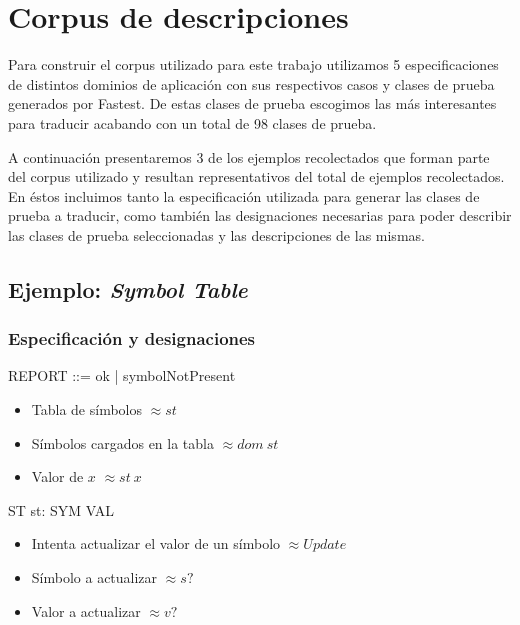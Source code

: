 \chapter{Corpus de descripciones}
\label{ape:corpus}

Para construir el corpus utilizado para este trabajo utilizamos 5 especificaciones de distintos dominios de aplicación con sus respectivos casos y clases de prueba generados por Fastest. De estas clases de prueba escogimos las más interesantes para traducir acabando con un total de 98 clases de prueba.

A continuación presentaremos 3 de los ejemplos recolectados que forman parte del corpus utilizado y resultan representativos del total de ejemplos recolectados. En éstos incluimos tanto la especificación utilizada para generar las clases de prueba a traducir, como también las designaciones necesarias para poder describir las clases de prueba seleccionadas y las descripciones de las mismas.

\section*{Ejemplo: \textit{Symbol Table}}

\subsection*{Especificación y designaciones}

\begin{zed}
 \also
REPORT ::= ok | symbolNotPresent
\end{zed}

\begin{itemize}
  \item Tabla de símbolos $\approx st$ \\
  \item Símbolos cargados en la tabla $\approx dom~st$ \\
  \item Valor de $x$ $\approx st~x$ 
\end{itemize}

\begin{schema}{ST}
st: SYM \pfun VAL
\end{schema}

\begin{itemize}
  \item Intenta actualizar el valor de un símbolo $\approx Update$ \\
  \item Símbolo a actualizar $\approx s?$ \\
  \item Valor a actualizar  $\approx v?$ 
\end{itemize}

